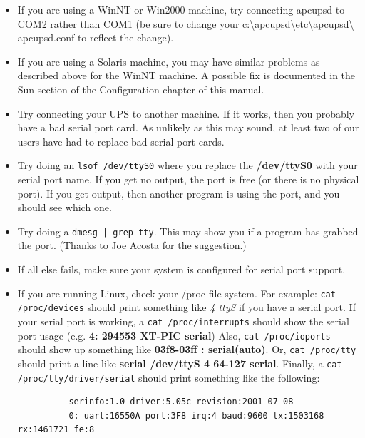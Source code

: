 {{{{{{{\begin{itemize}
Add the following to the end of the line: /NoSerialMice:COM1 (or COM2) so that
the new line looks like:  

\footnotesize
\begin{verbatim}
          multi(0)disk(0)rdisk(0)partition(1)\WINNT="Windows NT Workstation Version 4.00" /NoSerialMice:COM1
     
\end{verbatim}
\normalsize

\item If you are using a WinNT or Win2000 machine, try connecting apcupsd to
   COM2 rather than COM1 (be sure to change your
   c:\textbackslash{}apcupsd\textbackslash{}etc\textbackslash{}apcupsd\textbackslash
{}apcupsd.conf to reflect the change).  
\item If you are using a Solaris machine, you may have similar problems as
   described above for the WinNT machine. A possible fix is documented in the Sun
   section of the Configuration chapter of this manual.  
\item Try connecting your UPS to another machine. If it works, then you
   probably have a bad serial port card. As unlikely as this may sound, at least
   two of our users have had to replace bad serial port cards.  
\item Try doing an {\tt lsof /dev/ttyS0} where you replace the {\bf
   /dev/ttyS0} with your serial port name. If you get no output, the port is free
   (or there is no physical port). If you get output, then another program is
using the port, and you should see which one.  
\item Try doing a {\tt dmesg | grep tty}. This may show you if a program has
   grabbed the port. (Thanks to Joe Acosta for the suggestion.)  
\item If all else fails, make sure your system is configured for serial port
   support.  
\item If you are running Linux, check your /proc file system. For example:
   {\tt cat /proc/devices} should print something like {\it 4 ttyS} if you have a
   serial port. If your serial port is working, a {\tt cat /proc/interrupts}
should show the serial port usage (e.g. {\bf 4: 294553 XT-PIC serial}) Also,
{\tt cat /proc/ioports} should show up something like {\bf 03f8-03ff :
serial(auto)}. Or, {\tt cat /proc/tty} should print a line like {\bf serial
/dev/ttyS 4 64-127 serial}. Finally, a {\tt cat /proc/tty/driver/serial}
should print something like the following:  

\footnotesize
\begin{verbatim}
          serinfo:1.0 driver:5.05c revision:2001-07-08
          0: uart:16550A port:3F8 irq:4 baud:9600 tx:1503168 rx:1461721 fe:8
     

\end{verbatim}
\end{itemize}}}}}}}}
